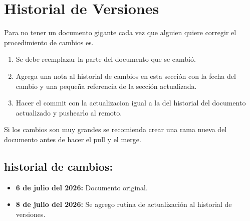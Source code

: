 \thispagestyle{plain}
\chapter[Historial de Versiones]{Historial de Versiones}
\label{cp:historialVersiones}

Para no tener un documento gigante cada vez que alguien quiere corregir el procedimiento de cambios es.
\begin{enumerate}
    \item Se debe reemplazar la parte del documento que se cambió.
    \item Agrega una nota al historial de cambios en esta sección con la fecha del cambio y una pequeña referencia de la sección actualizada.
    \item Hacer el commit con la actualizacion igual a la del historial del documento actualizado y pushearlo al remoto.
\end{enumerate}
Si los cambios son muy grandes se recomienda crear una rama nueva del documento antes de hacer el pull y el merge.

\section{historial de cambios:}
\begin{itemize}
    \item \textbf{ 6 de julio del 2026:} Documento original. 
    \item \textbf{ 8 de julio del 2026:} Se agrego rutina de actualización al historial de versiones.
\end{itemize}